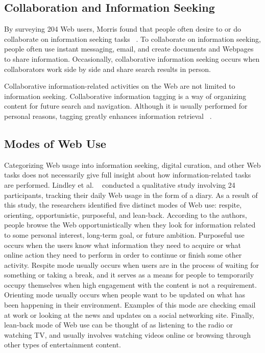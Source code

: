 \documentclass{casconpaper}
\begin{document}
{{{\subsection{Collaboration and Information Seeking}
By surveying 204 Web users, Morris found that people often desire to or do collaborate on information seeking tasks ~\cite{morris}. To collaborate on information seeking, people often use instant messaging, email, and create documents and Webpages to share information. Occasionally, collaborative information seeking occurs when collaborators work side by side and share search results in person.

Collaborative information-related activities on the Web are not limited to information seeking. Collaborative information tagging is a way of organizing content for future search and navigation. Although it is usually performed for personal reasons, tagging greatly enhances information retrieval ~\cite{golder}.

} %

{\subsection{Modes of Web Use}
Categorizing Web usage into information seeking, digital curation, and other Web tasks does not necessarily give full insight about how information-related tasks are performed. Lindley et al. ~\cite{lindley} conducted a qualitative study involving 24 participants, tracking their daily Web usage in the form of a diary. As a result of this study, the researchers identified five distinct modes of Web use: respite, orienting, opportunistic, purposeful, and lean-back. According to the authors, people browse the Web opportunistically when they look for information related to some personal interest, long-term goal, or future ambition. Purposeful use occurs when the users know what information they need to acquire or what online action they need to perform in order to continue or finish some other activity. Respite mode usually occurs when users are in the process of waiting for something or taking a break, and it serves as a means for people to temporarily occupy themselves when high engagement with the content is not a requirement. Orienting mode usually occurs when people want to be updated on what has been happening in their environment. Examples of this mode are checking email at work or looking at the news and updates on a social networking site. Finally, lean-back mode of Web use can be thought of as listening to the radio or watching TV, and usually involves watching videos online or browsing through other types of entertainment content. 

}}}
\end{document}
